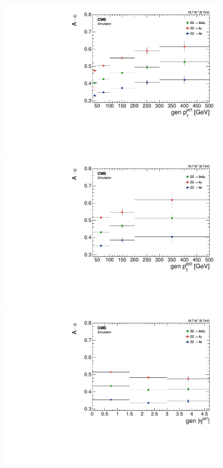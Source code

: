 \begin{figure}[hbtp]
  \begin{center}
    \includegraphics[width=\cmsFigWidth]{Figures/DiffAcceptance_PtJet1_Mad}
    \includegraphics[width=\cmsFigWidth]{Figures/DiffAcceptance_PtJet2_Mad}
    \includegraphics[width=\cmsFigWidth]{Figures/DiffAcceptance_EtaJet1_Mad}

\end{center}
\end{figure}
